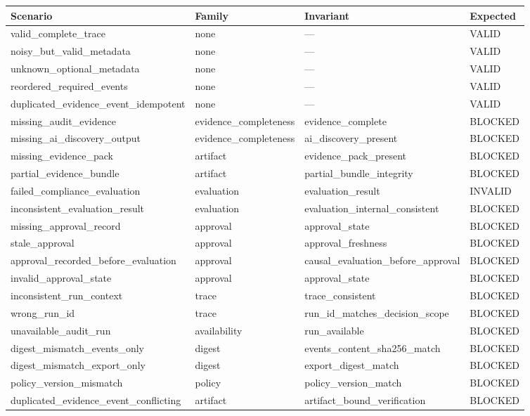 \begin{tabular}{llll}
\toprule
Scenario & Family & Invariant & Expected \\
\midrule
valid\_complete\_trace & none & --- & VALID \\
noisy\_but\_valid\_metadata & none & --- & VALID \\
unknown\_optional\_metadata & none & --- & VALID \\
reordered\_required\_events & none & --- & VALID \\
duplicated\_evidence\_event\_idempotent & none & --- & VALID \\
missing\_audit\_evidence & evidence\_completeness & evidence\_complete & BLOCKED \\
missing\_ai\_discovery\_output & evidence\_completeness & ai\_discovery\_present & BLOCKED \\
missing\_evidence\_pack & artifact & evidence\_pack\_present & BLOCKED \\
partial\_evidence\_bundle & artifact & partial\_bundle\_integrity & BLOCKED \\
failed\_compliance\_evaluation & evaluation & evaluation\_result & INVALID \\
inconsistent\_evaluation\_result & evaluation & evaluation\_internal\_consistent & BLOCKED \\
missing\_approval\_record & approval & approval\_state & BLOCKED \\
stale\_approval & approval & approval\_freshness & BLOCKED \\
approval\_recorded\_before\_evaluation & approval & causal\_evaluation\_before\_approval & BLOCKED \\
invalid\_approval\_state & approval & approval\_state & BLOCKED \\
inconsistent\_run\_context & trace & trace\_consistent & BLOCKED \\
wrong\_run\_id & trace & run\_id\_matches\_decision\_scope & BLOCKED \\
unavailable\_audit\_run & availability & run\_available & BLOCKED \\
digest\_mismatch\_events\_only & digest & events\_content\_sha256\_match & BLOCKED \\
digest\_mismatch\_export\_only & digest & export\_digest\_match & BLOCKED \\
policy\_version\_mismatch & policy & policy\_version\_match & BLOCKED \\
duplicated\_evidence\_event\_conflicting & artifact & artifact\_bound\_verification & BLOCKED \\
\bottomrule
\end{tabular}
